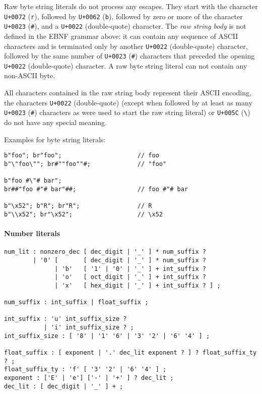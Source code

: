 \documentclass[]{article}
\begin{document}
Raw byte string literals do not process any escapes. They start with the
character \texttt{U+0072} (\texttt{r}), followed by \texttt{U+0062}
(\texttt{b}), followed by zero or more of the character \texttt{U+0023}
(\texttt{\#}), and a \texttt{U+0022} (double-quote) character. The
\emph{raw string body} is not defined in the EBNF grammar above: it can
contain any sequence of ASCII characters and is terminated only by
another \texttt{U+0022} (double-quote) character, followed by the same
number of \texttt{U+0023} (\texttt{\#}) characters that preceded the
opening \texttt{U+0022} (double-quote) character. A raw byte string
literal can not contain any non-ASCII byte.

All characters contained in the raw string body represent their ASCII
encoding, the characters \texttt{U+0022} (double-quote) (except when
followed by at least as many \texttt{U+0023} (\texttt{\#}) characters as
were used to start the raw string literal) or \texttt{U+005C}
(\texttt{\textbackslash{}}) do not have any special meaning.

Examples for byte string literals:

\begin{verbatim}
b"foo"; br"foo";                     // foo
b"\"foo\""; br#""foo""#;             // "foo"

b"foo #\"# bar";
br##"foo #"# bar"##;                 // foo #"# bar

b"\x52"; b"R"; br"R";                // R
b"\\x52"; br"\x52";                  // \x52
\end{verbatim}

\paragraph{Number literals}\label{number-literals}

\begin{verbatim}
num_lit : nonzero_dec [ dec_digit | '_' ] * num_suffix ?
        | '0' [       [ dec_digit | '_' ] * num_suffix ?
              | 'b'   [ '1' | '0' | '_' ] + int_suffix ?
              | 'o'   [ oct_digit | '_' ] + int_suffix ?
              | 'x'   [ hex_digit | '_' ] + int_suffix ? ] ;

num_suffix : int_suffix | float_suffix ;

int_suffix : 'u' int_suffix_size ?
           | 'i' int_suffix_size ? ;
int_suffix_size : [ '8' | '1' '6' | '3' '2' | '6' '4' ] ;

float_suffix : [ exponent | '.' dec_lit exponent ? ] ? float_suffix_ty ? ;
float_suffix_ty : 'f' [ '3' '2' | '6' '4' ] ;
exponent : ['E' | 'e'] ['-' | '+' ] ? dec_lit ;
dec_lit : [ dec_digit | '_' ] + ;
\end{verbatim}
\end{document}
